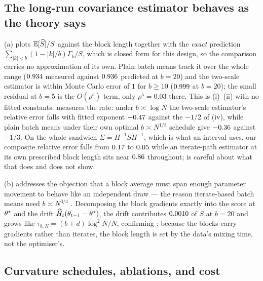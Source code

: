 \subsection{The long-run covariance estimator behaves as the theory says}

(a) plots $\mathbb{E}[\widehat S]/S$ against the block length together with the \emph{exact}
prediction $\sum_{|k|<b}(1-|k|/b)\Gamma_k/S$, which is closed form for this design, so the comparison
carries no approximation of its own. Plain batch means track it over the whole range ($0.934$
measured against $0.936$ predicted at $b=20$) and the two-scale estimator is within
Monte Carlo error of $1$ for $b\ge10$ ($0.999$ at $b=20$); the small residual at $b=5$ is the
$O(\rho^{b})$ term, only $\rho^5=0.03$ there. This is (i)--(ii) with no fitted constants.
\RefLrvRate{} measures the rate: under $b\asymp\log N$ the two-scale estimator's relative error falls
with fitted exponent $-0.47$ against the $-1/2$ of (iv), while plain batch means under
their own optimal $b\asymp N^{1/3}$ schedule give $-0.36$ against $-1/3$. On the whole sandwich
$\Sigma=H^{-1}SH^{-1}$, which is what an interval uses, our composite relative error falls from
$0.17$ to $0.05$ while an iterate-path estimator at its own prescribed block
length sits near $0.86$ throughout;  is careful about what that does and does not
show.

(b) addresses the objection that a block average must span enough parameter movement to
behave like an independent draw --- the reason iterate-based batch means need $b\asymp N^{3/4}$
\citep{samsonov2025statistical}. Decomposing the block gradients exactly into the score at $\theta^\star$ and
the drift $\widehat H_t(\theta_{t-1}-\theta^\star)$, the drift contributes $0.0010$ of $S$ at $b=20$
and grows like $\tau_{b,N}=(b+d)\log^2N/N$, confirming : because the blocks carry
gradients rather than iterates, the block length is set by the data's mixing time, not the optimiser's.

\subsection{Curvature schedules, ablations, and cost}

